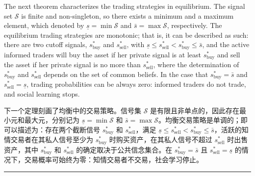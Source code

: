 \documentclass[12pt,a4paper]{article}
\newenvironment{original}{%
  \par\vspace{4pt}\noindent%
  \color{black}%
  \ignorespaces
}{%
  \par\vspace{2pt}%
}
\newenvironment{translation}{%
  \par\vspace{2pt}\noindent%
  \color{transblue}%
  \ignorespaces
}{%
  \par\vspace{4pt}\hrule\vspace{6pt}%
}
\begin{document}
\begin{original}
The next theorem characterizes the trading strategies in equilibrium. The signal set $\mathcal{S}$ is finite and non-singleton, so there exists a minimum and a maximum element, which denoted by $\underline{s} = \min \mathcal{S}$ and $\bar{s} = \max \mathcal{S}$, respectively. The equilibrium trading strategies are monotonic; that is, it can be described as such: there are two cutoff signals, $s^*_{\text{buy}}$ and $s^*_{\text{sell}}$, with $\underline{s} \leq s^*_{\text{sell}} < s^*_{\text{buy}} \leq \bar{s}$, and the active informed traders will buy the asset if her private signal is at least $s^*_{\text{buy}}$ and sell the asset if her private signal is no more than $s^*_{\text{sell}}$, where the determination of $s^*_{\text{buy}}$ and $s^*_{\text{sell}}$ depends on the set of common beliefs. In the case that $s^*_{\text{buy}} = \bar{s}$ and $s^*_{\text{sell}} = \underline{s}$, trading probabilities can be always zero: informed traders do not trade, and social learning stops.
\end{original}
\begin{translation}
下一个定理刻画了均衡中的交易策略。信号集 $\mathcal{S}$ 是有限且非单点的，因此存在最小元和最大元，分别记为 $\underline{s} = \min \mathcal{S}$ 和 $\bar{s} = \max \mathcal{S}$。均衡交易策略是单调的；即可以描述为：存在两个截断信号 $s^*_{\text{buy}}$ 和 $s^*_{\text{sell}}$，满足 $\underline{s} \leq s^*_{\text{sell}} < s^*_{\text{buy}} \leq \bar{s}$，活跃的知情交易者在其私人信号至少为 $s^*_{\text{buy}}$ 时购买资产，在其私人信号不超过 $s^*_{\text{sell}}$ 时出售资产，其中 $s^*_{\text{buy}}$ 和 $s^*_{\text{sell}}$ 的确定取决于公共信念集合。在 $s^*_{\text{buy}} = \bar{s}$ 且 $s^*_{\text{sell}} = \underline{s}$ 的情况下，交易概率可始终为零：知情交易者不交易，社会学习停止。
\end{translation}
\end{document}
